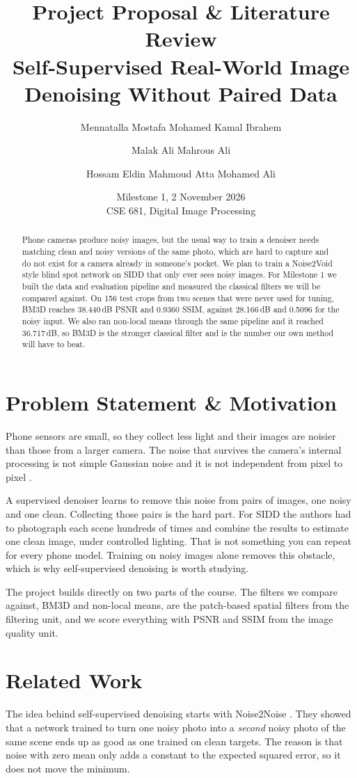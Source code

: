\documentclass[11pt]{article}
\title{\LARGE Project Proposal \& Literature Review \\[4pt]
\large Self-Supervised Real-World Image Denoising Without Paired Data}
\author{
  Mennatalla Mostafa Mohamed Kamal Ibrahem \and
  Malak Ali Mahrous Ali \and
  Hossam Eldin Mahmoud Atta Mohamed Ali
}
\date{Milestone 1, 2 November 2026 \\{} CSE 681, Digital Image Processing}
\begin{document}
\maketitle

\begin{abstract}
Phone cameras produce noisy images, but the usual way to train a denoiser needs matching
clean and noisy versions of the same photo, which are hard to capture and do not exist for
a camera already in someone's pocket. We plan to train a Noise2Void style blind spot
network on SIDD that only ever sees noisy images. For Milestone 1 we built the data and
evaluation pipeline and measured the classical filters we will be compared against. On 156
test crops from two scenes that were never used for tuning, BM3D reaches 38.440\,dB PSNR
and 0.9360 SSIM, against 28.166\,dB and 0.5096 for the noisy input. We also ran non-local
means through the same pipeline and it reached 36.717\,dB, so BM3D is the stronger
classical filter and is the number our own method will have to beat.
\end{abstract}

\section{Problem Statement \& Motivation}
\label{sec:motivation}
Phone sensors are small, so they collect less light and their images are noisier than
those from a larger camera. The noise that survives the camera's internal processing is
not simple Gaussian noise and it is not independent from pixel to pixel
\citep{abdelhamed2018sidd}.

A supervised denoiser learns to remove this noise from pairs of images, one noisy and one
clean. Collecting those pairs is the hard part. For SIDD the authors had to photograph
each scene hundreds of times and combine the results to estimate one clean image, under
controlled lighting. That is not something you can repeat for every phone model. Training
on noisy images alone removes this obstacle, which is why self-supervised denoising is
worth studying.

The project builds directly on two parts of the course. The filters we compare against,
BM3D and non-local means, are the patch-based spatial filters from the filtering unit, and
we score everything with PSNR and SSIM from the image quality unit.

\section{Related Work}
\label{sec:related}
The idea behind self-supervised denoising starts with Noise2Noise
\citep{lehtinen2018noise2noise}. They showed that a network trained to turn one noisy photo
into a \emph{second} noisy photo of the same scene ends up as good as one trained on clean
targets. The reason is that noise with zero mean only adds a constant to the expected
squared error, so it does not move the minimum.
\end{document}
